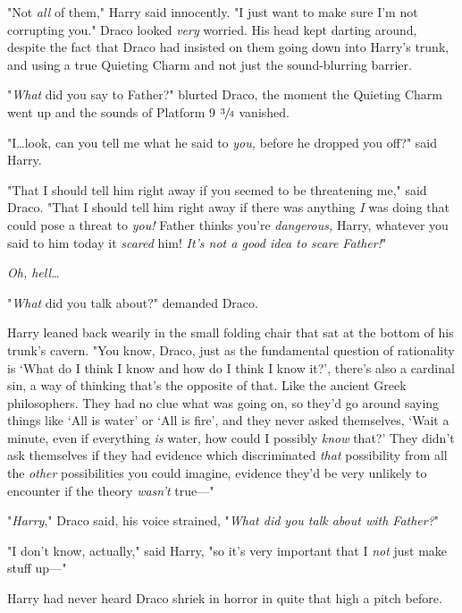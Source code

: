 "Not \emph{all} of them," Harry said innocently. "I just want to make sure I’m
not corrupting you."
\later
Draco looked \emph{very} worried. His head kept darting around, despite the
fact that Draco had insisted on them going down into Harry’s trunk, and using a
true Quieting Charm and not just the sound-blurring barrier.

"\emph{What} did you say to Father?" blurted Draco, the moment the Quieting
Charm went up and the sounds of Platform 9 $\sfrac{3}{4}$ vanished.

"I…look, can you tell me what he said to \emph{you,} before he dropped
you off?" said Harry.

"That I should tell him right away if you seemed to be threatening me," said
Draco. "That I should tell him right away if there was anything \emph{I} was
doing that could pose a threat to \emph{you!} Father thinks you’re
\emph{dangerous,} Harry, whatever you said to him today it \emph{scared} him!
\emph{It’s not a good idea to scare Father!}"

\emph{Oh, hell…}

"\emph{What} did you talk about?" demanded Draco.

Harry leaned back wearily in the small folding chair that sat at the bottom of
his trunk’s cavern. "You know, Draco, just as the fundamental question of
rationality is ‘What do I think I know and how do I think I know it?’, there’s
also a cardinal sin, a way of thinking that’s the opposite of that. Like the
ancient Greek philosophers. They had no clue what was going on, so they’d go
around saying things like ‘All is water’ or ‘All is fire’, and they never asked
themselves, ‘Wait a minute, even if everything \emph{is} water, how could I
possibly \emph{know} that?’ They didn’t ask themselves if they had evidence
which discriminated \emph{that} possibility from all the \emph{other}
possibilities you could imagine, evidence they’d be very unlikely to encounter
if the theory \emph{wasn’t} true—"

"\emph{Harry}," Draco said, his voice strained, "\emph{What did you talk about
with Father?}"

"I don’t know, actually," said Harry, "so it’s very important that I \emph{not}
just make stuff up—"

Harry had never heard Draco shriek in horror in quite that high a pitch before.
